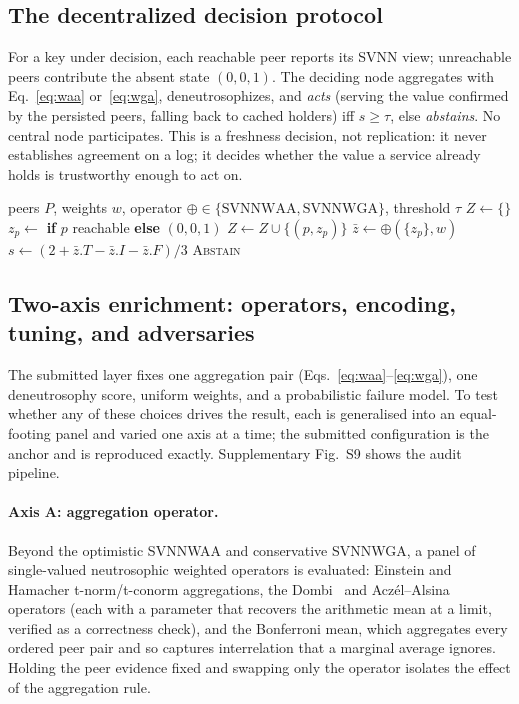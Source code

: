 \documentclass[fleqn,10pt]{wlscirep}
\begin{document}
\subsection{The decentralized decision protocol}
For a key under decision, each reachable peer reports its SVNN view; unreachable peers contribute the
absent state $(0,0,1)$. The deciding node aggregates with Eq.~\eqref{eq:waa} or~\eqref{eq:wga},
deneutrosophizes, and \emph{acts} (serving the value confirmed by the persisted peers, falling back to
cached holders) iff $s\geq\tau$, else \emph{abstains}. No central node participates. This is a
freshness decision, not replication: it never establishes agreement on a log; it decides whether the
value a service already holds is trustworthy enough to act on.

\begin{algorithm}[t]
\caption{Decentralized neutrosophic freshness decision for key $k$}
\label{alg:decide}
\begin{algorithmic}[1]
\Require peers $P$, weights $w$, operator $\oplus\in\{\mathrm{SVNNWAA},\mathrm{SVNNWGA}\}$, threshold $\tau$
\State $Z \gets \{\}$
  \State $z_p \gets$  \textbf{if} $p$ reachable \textbf{else} $(0,0,1)$ 
  \State $Z \gets Z \cup \{(p, z_p)\}$
\EndFor
\State $\bar{z} \gets \oplus(\{z_p\}, w)$ 
\State $s \gets (2 + \bar{z}.T - \bar{z}.I - \bar{z}.F)/3$ 
  \State \Return {}
\Else
  \State \Return \textsc{Abstain}
\EndIf
\end{algorithmic}
\end{algorithm}

\subsection{Two-axis enrichment: operators, encoding, tuning, and adversaries}
\label{sec:enrich}
The submitted layer fixes one aggregation pair (Eqs.~\eqref{eq:waa}--\eqref{eq:wga}), one
deneutrosophy score, uniform weights, and a probabilistic failure model. To test whether any of these
choices drives the result, each is generalised into an equal-footing panel and varied one axis at a
time; the submitted configuration is the anchor and is reproduced exactly. Supplementary Fig.~S9
shows the audit pipeline.

\paragraph{Axis A: aggregation operator.} Beyond the optimistic SVNNWAA and conservative SVNNWGA, a
panel of single-valued neutrosophic weighted operators is evaluated: Einstein and Hamacher
t-norm/t-conorm aggregations, the Dombi~\cite{dombi1982} and Acz\'el--Alsina~\cite{aczel1982}
operators (each with a parameter that recovers the arithmetic mean at a limit, verified as a
correctness check), and the Bonferroni mean, which aggregates every ordered peer pair and so captures
interrelation that a marginal average ignores. Holding the peer evidence fixed and swapping only the
operator isolates the effect of the aggregation rule.
\end{document}
